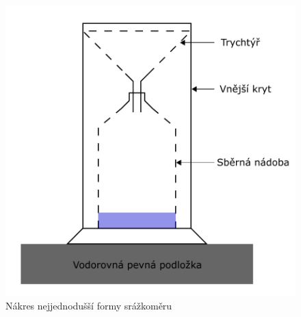     \begin{figure}[!h]
      \begin{center}
        \includegraphics[scale=0.7]{obrazky/prace/rain_gauge.pdf}
      \end{center}
      \caption[Srážkoměr]{Nákres nejjednodušší formy srážkoměru \cite{nkURfCvWR2piX49C}}
      \label{obr:Srážkoměr}
    \end{figure}

